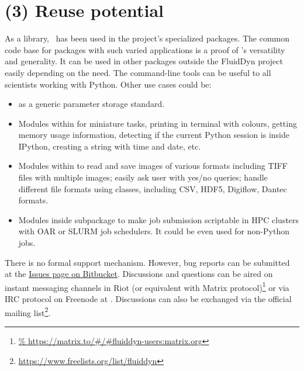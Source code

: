 \section*{(3) Reuse potential}
%
%

As a library, \fluiddyn\ has been used in the project's specialized packages.
The common code base for packages with such varied applications is a proof of
\fluiddyn's versatility and generality. It can be used in other packages outside
the FluidDyn project easily depending on the need. The command-line tools can
be useful to all scientists working with Python. Other use cases could be:
\begin{itemize}
	\item {} as a generic parameter storage
		standard.
	\item Modules within  for miniature tasks,
		printing in terminal with colours, getting memory usage
		information, detecting if the current Python session is inside
		IPython, creating a string with time and date, etc.
	\item Modules within  to read
		and save images of various formats including TIFF files with
		multiple images; easily ask user with yes/no queries; handle
		different file formats using classes, including CSV, HDF5,
		Digiflow, Dantec formats.
	\item Modules inside  subpackage to
		make job submission scriptable in HPC clusters with OAR or
		SLURM job schedulers. It could be even used for non-Python
		jobs.
\end{itemize}


There is no formal support mechanism. However, bug reports can be submitted at the
\href{https://bitbucket.org/fluiddyn/fluiddyn/issues}{Issues page on Bitbucket}.
Discussions and questions can be aired on instant messaging channels in Riot (or
equivalent with Matrix protocol)\footnote{
\url{%
  https://matrix.to/\#/\#fluiddyn-users:matrix.org}}
or via IRC protocol on Freenode at . Discussions
can also be exchanged via the official mailing list\footnote{
\url{https://www.freelists.org/list/fluiddyn}}.

